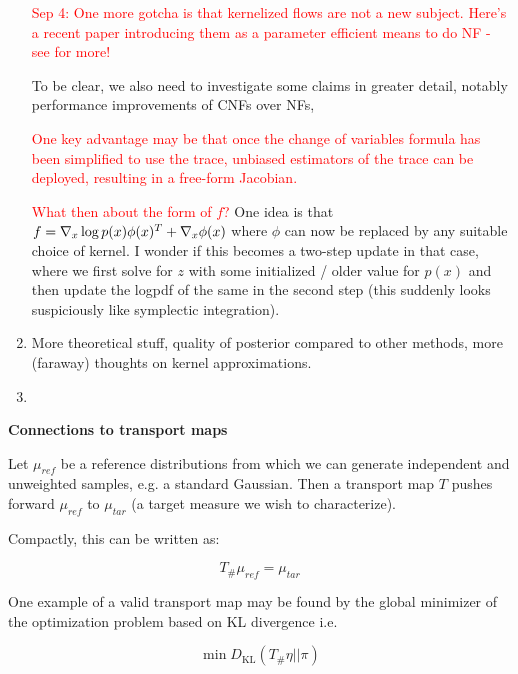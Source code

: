 \documentclass[12pt]{article}
\renewcommand{\[}{\left[}
\renewcommand{\]}{\right]}
\renewcommand{\(}{\left(}
\renewcommand{\)}{\right)}
\newcommand{\grad}[1]{\nabla #1}
\newcommand{\DKL}{D_{\mathrm{KL}}}
\begin{document}
\begin{enumerate}
    \textcolor{red}{Sep 4: One more gotcha is that kernelized flows are not a new subject. Here's a recent paper introducing them as a parameter efficient means to do NF - see \cite{english_kernelised_2024} for more!}

    To be clear, we also need to investigate some claims in greater detail, notably performance improvements of CNFs over NFs, 

    \textcolor{red}{One key advantage may be that once the change of variables formula has been simplified to use the trace, unbiased estimators of the trace can be deployed, resulting in a free-form Jacobian.}

    \textcolor{red}{What then about the form of $f$?} One idea is that $f = \grad_x \log p(x) \phi(x)^T + \grad_x \phi(x)$ where $\phi$ can now be replaced by any suitable choice of kernel. I wonder if this becomes a two-step update in that case, where we first solve for $z$ with some initialized / older value for $p(x)$ and then update the logpdf of the same in the second step (this suddenly looks suspiciously like symplectic integration).

    \item More theoretical stuff, quality of posterior compared to other methods, more (faraway) thoughts on kernel approximations.

    \item 
\end{enumerate}

\noindent \textbf{Connections to transport maps}

Let $\mu_{ref}$ be a reference distributions from which we can generate independent and unweighted samples, e.g. a standard Gaussian. Then a transport map $T$ pushes forward $\mu_{ref}$ to $\mu_{tar}$ (a target measure we wish to characterize). 

Compactly, this can be written as:

$$T_{\#}\mu_{ref} = \mu_{tar}$$

One example of a valid transport map may be found by the global minimizer of the optimization problem based on KL divergence i.e.

$$\min \DKL (T_{\#} \eta || \pi)$$
\end{document}
